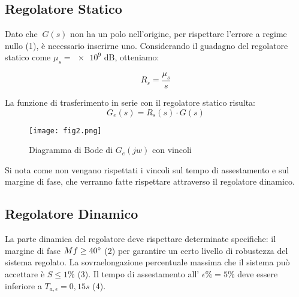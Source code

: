 \documentclass{article}
\begin{document}
\subsection{Regolatore Statico}

Dato che $\ G(s)$ non ha un polo nell'origine, per rispettare l'errore a regime nullo (1), è necessario inserirne uno. Considerando il guadagno del regolatore statico come  $ \mu_s =\num{e9}$ dB, otteniamo:

\[ R_s = \frac{\mu_s}{s}  \]


La funzione di trasferimento in serie con il regolatore statico risulta:
\[ G_e(s) = R_s(s) \cdot G(s) \]

\begin{figure}[!h]
\centering
\texttt{[image: fig2.png]}
\caption{\label{fig:orbit}Diagramma di Bode di $G_e(jw)$ con vincoli}
\end{figure}

Si nota come non vengano rispettati i vincoli sul tempo di assestamento e sul margine di fase, che verranno fatte rispettare attraverso il regolatore dinamico.


\subsection{Regolatore Dinamico}
 La parte dinamica del regolatore deve rispettare determinate specifiche: il margine di fase $ Mf \geq 40\degree $ (2) per garantire un certo livello di robustezza del sistema regolato. 
La sovraelongazione percentuale massima che il sistema può accettare è $ S \leq 1\% $ (3). Il tempo di assestamento all' $ \epsilon\% = 5\%$ deve essere inferiore a $ T_{a,\epsilon}=0,15s $ (4).\\
\end{document}
